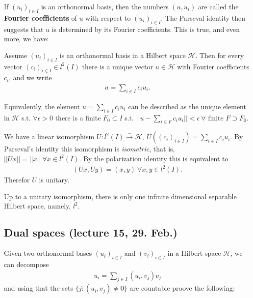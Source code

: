If \((u_i)_{i\in I }\) is an orthonormal basis, then the numbers \((u,u_i)\) are called the \textbf{Fourier coefficients} of \(u\) with 
respect to \((u_i)_{i\in I}\). The Parseval identity then suggests that \(u\) is determined by its Fourier coefficients. This is true, 
and even more, we have:
\begin{proposition}
    Assume \((u_i)_{i\in I}\) is an orthonormal basis in a Hilbert space \(\mathcal{H}\). Then for every vector \((c_i)_{i\in I}\in l^2(I)\)
    there is a unique vector \(u\in \mathcal{H}\) with Fourier coefficients \(c_i\), and we write
    \begin{align*}
        u = \sum\limits_{i\in I} c_i u_i.
    \end{align*}
\end{proposition}
\begin{remark}
    Equivalently, the element \(u=\sum_{i\in I}c_i u_i\) can be described as the unique element in \(\mathcal{H}\) s.t. \(\forall \epsilon>0\)
    there is a finite \(F_0\subset I\) s.t. \(||u - \sum_{i\in F}c_i u_i || < \epsilon \ \forall \text{ finite } F\supset F_0\).
\end{remark}
\begin{corollary}
    We have a linear isomorphism \(U:l^2(I)\xrightarrow[ ]{\sim}\mathcal{H}, \ U\left((c_i)_{i\in I}\right) = \sum_{i\in I}c_i u_i\).
    By Parseval's identity this isomorphism is \emph{isometric}, that is, \(||Ux|| = ||x|| \ \forall x\in l^2(I)\). By the polarization identity
    this is equivalent to 
    \begin{align*}
        (Ux,Uy) = (x,y) \ \forall x,y\in l^2(I).
    \end{align*}
    Therefor \(U\) is unitary.
\end{corollary}
\begin{corollary}
    Up to a unitary isomorphism, there is only one infinite dimensional separable Hilbert space, namely, \(l^2\).
\end{corollary}

\subsection*{Dual spaces (lecture 15, 29. Feb.)}
\ifdetailed 
Given two orthonormal bases \((u_i)_{i\in I}\) and \((v_i)_{i\in I}\) in a Hilbert space \(\mathcal{H}\), we can decompose
\begin{align*}
    u_i = \sum\limits_{j\in I} (u_i,v_j)v_j
\end{align*}
and using that the sets \(\{j:(u_i,v_j)\neq 0\}\) are countable proove the following:

